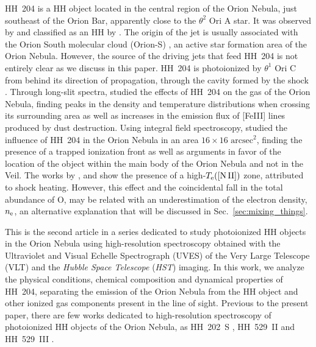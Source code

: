 \documentclass[twocolumn,linenumbers]{aastex63}
\begin{document}

HH~204 is a HH object located in the central region of the Orion Nebula, just southeast of the Orion Bar, apparently close to the $\theta^{2} \text{ Ori A}$ star. It was observed by \citet{munch62} and classified as an HH by \citet{Canto80}. The origin of the jet is usually associated with the Orion South molecular cloud (Orion-S) \citep{odell17}, an active star formation area of the Orion Nebula. However, the source of the driving jets that feed HH~204 is not entirely clear as we discuss in this paper. HH~204 is photoionized by $\theta^{1} \text{ Ori C}$ from behind its direction of propagation, through the cavity formed by the shock \citep{odell97,odell17}. Through long-slit spectra, \citet{mesadelgado08} studied the effects of HH~204 on the gas of the Orion Nebula, finding peaks in the density and temperature distributions when crossing its surrounding area as well as increases in the emission flux of [Fe\thinspace III] lines produced by dust destruction. Using integral field spectroscopy,  \citet{nunezdiaz12} studied the influence of HH~204 in the Orion Nebula in an area $16\times 16 \text{ arcsec}^2$, finding the presence of a trapped ionization front as well as arguments in favor of the location of the object within the main body of the Orion Nebula and not in the Veil. The works by \citet{mesadelgado08}, \citet{nunezdiaz12} and \citet{odell17} show the presence of a high-$T_{\rm e}(\text{[N\thinspace II]})$ zone, attributed to shock heating. However, this effect and the coincidental fall in the total abundance of O, may be related with an underestimation of the electron density, $n_{\rm e}$, an alternative explanation that will be discussed in Sec.~\ref{sec:mixing_things}. 

This is the second article in a series dedicated to study photoionized HH objects in the Orion Nebula using high-resolution spectroscopy obtained with the  Ultraviolet and Visual Echelle Spectrograph (UVES) \citep{Dodorico00} of the Very Large Telescope (VLT) and the \textit{Hubble Space Telescope} (\textit{HST}) imaging. In this work, we analyze the physical conditions, chemical composition and dynamical properties of HH~204, separating the emission of the Orion Nebula from the HH object and other ionized gas components present in the line of sight. Previous to the present paper, there are few works dedicated to high-resolution spectroscopy of photoionized HH objects of the Orion Nebula, as HH~202~S \citep{mesadelgado09}, HH~529~II and HH~529~III \citep{Blagrave06, mendez2021}. 
\end{document}
